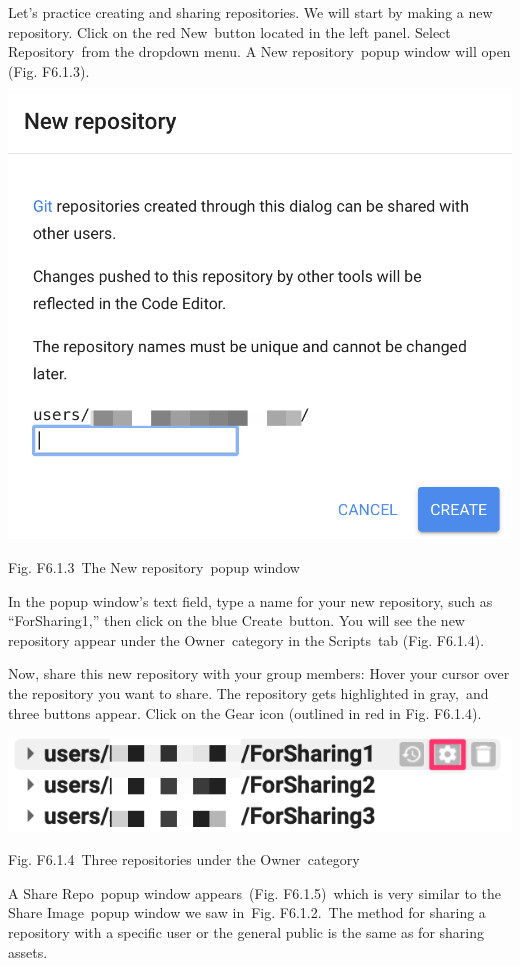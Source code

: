 \documentclass[
  letterpaper,
  DIV=11,
  numbers=noendperiod]{scrreprt}
\begin{document}
Let's practice creating and sharing repositories. We will start by
making a new repository. Click on the red New~button located in the left
panel. Select Repository~from the dropdown menu. A New repository~popup
window will open (Fig. F6.1.3).

\includegraphics{./F6/image25.png}

Fig. F6.1.3~The New repository~popup window

In the popup window's text field, type a name for your new repository,
such as ``ForSharing1,'' then click on the blue Create~button. You will
see the new repository appear under the Owner~category in the
Scripts~tab (Fig. F6.1.4).

Now, share this new repository with your group members: Hover your
cursor over the repository you want to share. The repository gets
highlighted in gray,~and three buttons appear. Click on the Gear icon
(outlined in red in Fig. F6.1.4).

\includegraphics{./F6/image71.png}

Fig. F6.1.4~Three repositories under the Owner~category

A Share Repo~popup window appears~(Fig. F6.1.5)~which is very similar to
the Share Image~popup window we saw in~Fig. F6.1.2.~The method for
sharing a repository with a specific user or the general public is the
same as for sharing assets.
\end{document}
